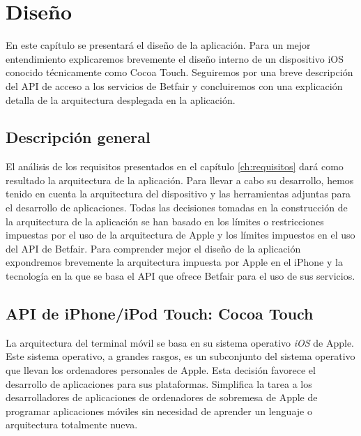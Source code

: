 \chapter{Diseño}
\label{ch:diseno}


En este capítulo se presentará el diseño de la aplicación. Para un mejor entendimiento explicaremos brevemente el diseño interno de un dispositivo iOS conocido técnicamente como Cocoa Touch. Seguiremos por una breve descripción del API de acceso a los servicios de Betfair y concluiremos con una explicación detalla de la arquitectura desplegada en la aplicación.


\section{Descripción general}
 
  El análisis de los requisitos presentados en el capítulo \ref{ch:requisitos} %
   dará como resultado la arquitectura de la aplicación. Para llevar a cabo su desarrollo, hemos tenido en cuenta la arquitectura del dispositivo y las herramientas adjuntas para el desarrollo de aplicaciones. Todas las decisiones tomadas en la construcción de la arquitectura de la aplicación se han basado en los límites o restricciones impuestas por el uso de la arquitectura de Apple y los límites impuestos en el uso del API de Betfair. Para comprender mejor el diseño de la aplicación expondremos brevemente la arquitectura impuesta por Apple en el iPhone y la tecnología en la que se basa el API que ofrece Betfair para el uso de sus servicios.

\section{API de iPhone/iPod Touch: Cocoa Touch}
 La arquitectura del terminal móvil se basa en su sistema operativo \emph{iOS} de Apple. Este sistema operativo, a grandes rasgos, es un subconjunto del sistema operativo que llevan los ordenadores personales de Apple. Esta decisión favorece el desarrollo de aplicaciones para sus plataformas. Simplifica la tarea a los desarrolladores de aplicaciones de ordenadores de sobremesa de Apple de programar aplicaciones móviles sin necesidad de aprender un lenguaje o arquitectura totalmente nueva.
 
